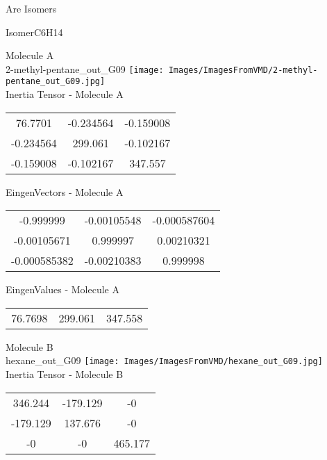 \begin{center}
\vtab
\vtab
\textcolor{NavyBlue}{\Large Are Isomers}
\end{center}
\newpage

\vtab[-2cm]
\begin{center}
{\large IsomerC6H14}
\end{center}
\begin{multicols}{2}
\begin{center}
Molecule A \\ 
2-methyl-pentane\_out\_G09
\texttt{[image: Images/ImagesFromVMD/2-methyl-pentane\_out\_G09.jpg]}
\\
Inertia Tensor - Molecule A \\
\vtab
\begin{tabular}{|c c c|}
76.7701	 & 	-0.234564	 & 	-0.159008	 \\
-0.234564	 & 	299.061	 & 	-0.102167	 \\
-0.159008	 & 	-0.102167	 & 	347.557
\end{tabular}

\vtab
 EingenVectors - Molecule A     \\
\vtab
\begin{tabular}{|c c c|}
-0.999999	 & 	-0.00105548	 & 	-0.000587604	 \\
-0.00105671	 & 	0.999997	 & 	0.00210321	 \\
-0.000585382	 & 	-0.00210383	 & 	0.999998
\end{tabular}

\vtab
 EingenValues - Molecule A     \\
\vtab
\begin{tabular}{|c c c|}
76.7698	 & 	299.061	 & 	347.558
\end{tabular}
\columnbreak

Molecule B \\ 
hexane\_out\_G09
\texttt{[image: Images/ImagesFromVMD/hexane\_out\_G09.jpg]}
\\
Inertia Tensor - Molecule B \\
\vtab
\begin{tabular}{|c c c|}
346.244	 & 	-179.129	 & 	-0	 \\
-179.129	 & 	137.676	 & 	-0	 \\
-0	 & 	-0	 & 	465.177
\end{tabular}


\end{center}
\end{multicols}
